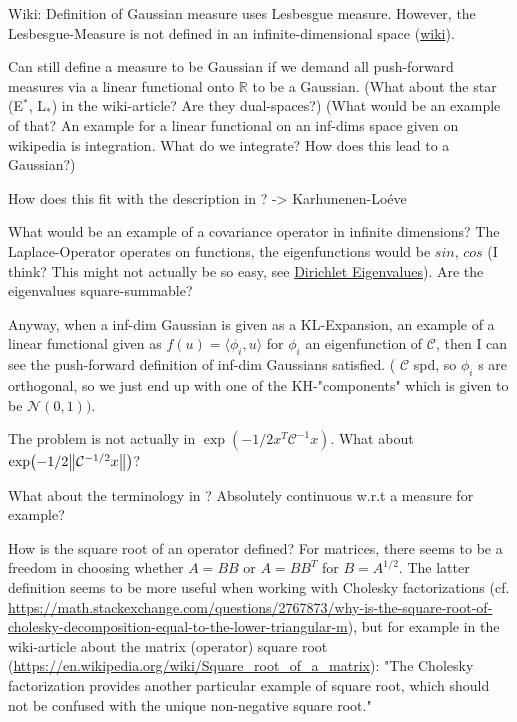 \documentclass[11pt]{article}
\newcommand{\C}{{\mathcal{C}}}
\newcommand{\R}{{\mathbb{R}}}
\newcommand{\N}[2]{\mathcal{N}\left(#1,#2\right)}
\begin{document}
Wiki: Definition of Gaussian measure uses Lesbesgue measure.
However, the Lesbesgue-Measure is not defined in an infinite-dimensional space (\href{https://en.wikipedia.org/wiki/Infinite-dimensional\_Lebesgue\_measure}{wiki}).

Can still define a measure to be Gaussian if we demand all push-forward measures via a
linear functional onto \(\R\) to be a Gaussian. (What about the star (E\(^{\text{*}}\), L\(_{\text{*}}\))
in the wiki-article? Are they dual-spaces?) (What would be an example of that? An example
for a linear functional on an inf-dims space given on wikipedia is integration.
What do we integrate? How does this lead to a Gaussian?)

How does this fit with the description in \cite{cotter_mcmc_2013}? -> Karhunenen-Loéve

What would be an example of a covariance operator in infinite dimensions?
The Laplace-Operator operates on functions, the eigenfunctions would be \(sin\), \(cos\) (I think?
This might not actually be so easy, see \href{https://en.wikipedia.org/wiki/Dirichlet\_eigenvalue}{Dirichlet Eigenvalues}). Are the eigenvalues
square-summable?

Anyway, when a inf-dim Gaussian is given as a KL-Expansion, an  example of a linear functional
given as \(f(u) = \langle \phi_i, u \rangle\) for \(\phi_i\) an eigenfunction of \(\C\), then I can see
the push-forward definition of inf-dim Gaussians satisfied. ( \(\C\) spd, so \(\phi_i\) s are
orthogonal, so we just end up with one of the KH-"components" which is given to be \(\N{0}{1})\).

The problem is not actually in \(\exp(-1/2x^T\C^{-1}x)\). What about \(\exp(-1/2\norm{\C^{-1/2}x})\)?

What about the terminology in \cite{cotter_mcmc_2013}? Absolutely continuous w.r.t a measure for
example?

How is the square root of an operator defined? For matrices, there seems to be a freedom in
choosing whether \(A = BB\) or \(A = BB^T\) for \(B = A^{1/2}\). The latter definition seems to
be more useful when working with Cholesky factorizations (cf. \url{https://math.stackexchange.com/questions/2767873/why-is-the-square-root-of-cholesky-decomposition-equal-to-the-lower-triangular-m}),
but for example in the wiki-article about the matrix (operator) square root (\url{https://en.wikipedia.org/wiki/Square\_root\_of\_a\_matrix}):
"The Cholesky factorization provides another particular example of square root, which should not be confused with the unique non-negative square root."
\end{document}
